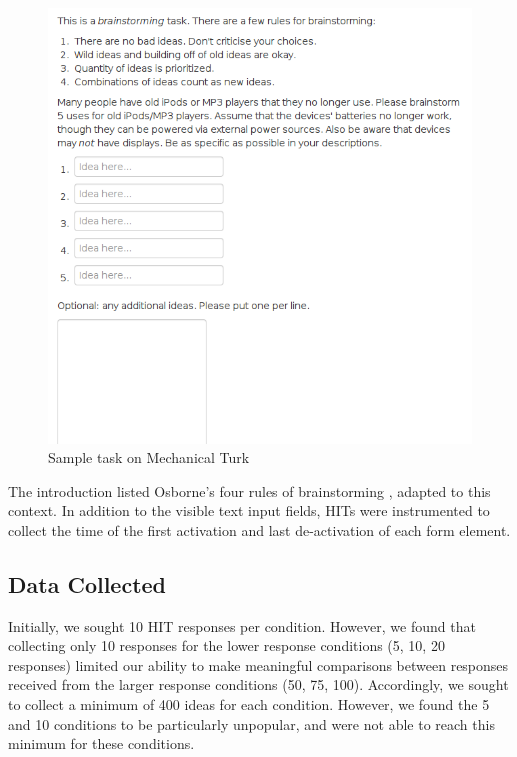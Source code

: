 \begin{figure}[h!]
    \centering
    \includegraphics[width=0.9\columnwidth]{sample_task}
    \caption{Sample task on Mechanical Turk}
    \label{fig:sample_task}
\end{figure}

The introduction listed Osborne's four rules of brainstorming \cite{osborn_applied_1957}, adapted to this context.
In addition to the visible text input fields, HITs were instrumented to collect the time of the first activation and last de-activation of each form element.

\subsection{Data Collected}

Initially, we sought 10 HIT responses per condition. However, we found that collecting only 10 responses for the lower response conditions (5, 10, 20 responses) limited our ability to make meaningful comparisons between responses received from the larger response conditions (50, 75, 100). Accordingly, we sought to collect a minimum of 400 ideas for each condition. However, we found the 5 and 10 conditions to be particularly unpopular, and were not able to reach this minimum for these conditions.

